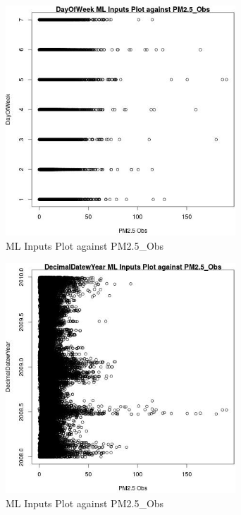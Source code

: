 \begin{figure} 
\centering  
\includegraphics[width=0.77\textwidth]{Code_Outputs/Report_ML_input_PM25_Step4_part_e_de_duplicated_aves_DayOfWeekvPM25_Obs.jpg} 
\caption{\label{fig:Report_ML_input_PM25_Step4_part_e_de_duplicated_avesDayOfWeekvPM25_Obs}ML Inputs Plot against PM2.5_Obs} 
\end{figure} 
 

\begin{figure} 
\centering  
\includegraphics[width=0.77\textwidth]{Code_Outputs/Report_ML_input_PM25_Step4_part_e_de_duplicated_aves_DecimalDatewYearvPM25_Obs.jpg} 
\caption{\label{fig:Report_ML_input_PM25_Step4_part_e_de_duplicated_avesDecimalDatewYearvPM25_Obs}ML Inputs Plot against PM2.5_Obs} 
\end{figure} 
 

